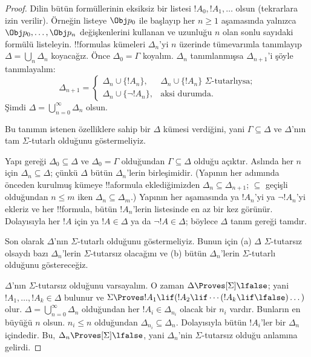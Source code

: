 \begin{proof}
Dilin bütün formüllerinin eksiksiz bir listesi $!A_0,!A_1,\dots$ olsun
(tekrarlara izin verilir). Örneğin listeye $\Obj p_0$ ile başlayıp her
$n\ge 1$ aşamasında yalnızca $\Obj p_0,\dots,\Obj p_n$ değişkenlerini
kullanan ve uzunluğu $n$ olan sonlu sayıdaki formülü listeleyin. !!{formula}s
kümeleri $\Delta_n$'yi $n$ üzerinde tümevarımla tanımlayıp
$\Delta=\bigcup_n\Delta_n$ koyacağız. Önce $\Delta_0=\Gamma$ koyalım.
$\Delta_n$ tanımlanmışsa $\Delta_{n+1}$'i şöyle tanımlayalım:
\[
\Delta_{n+1} =
\begin{cases}
  \Delta_n \cup \{!A_n\}, & \text{$\Delta_n \cup \{ !A_n\}$
    $\Sigma$-tutarlıysa;} \\
  \Delta_n \cup \{ \lnot !A_n\}, & \text{aksi durumda.}
\end{cases}
\]
Şimdi $\Delta=\bigcup_{n=0}^\infty\Delta_n$ olsun.

Bu tanımın istenen özelliklere sahip bir $\Delta$ kümesi verdiğini, yani
$\Gamma\subseteq\Delta$ ve $\Delta$'nın tam $\Sigma$-tutarlı olduğunu
göstermeliyiz.

Yapı gereği $\Delta_0\subseteq\Delta$ ve $\Delta_0=\Gamma$ olduğundan
$\Gamma\subseteq\Delta$ olduğu açıktır. Aslında her $n$ için
$\Delta_n\subseteq\Delta$; çünkü $\Delta$ bütün $\Delta_n$'lerin
birleşimidir. (Yapının her adımında önceden kurulmuş kümeye !!a{formula}
eklediğimizden $\Delta_n\subseteq\Delta_{n+1}$; $\subseteq$ geçişli
olduğundan $n\le m$ iken $\Delta_n\subseteq\Delta_m$.) Yapının her
aşamasında ya $!A_n$'yi ya $\lnot !A_n$'yi ekleriz ve her !!{formula}, bütün
$!A_n$'lerin listesinde en az bir kez görünür. Dolayısıyla her $!A$ için ya
$!A\in\Delta$ ya da $\lnot !A\in\Delta$; böylece $\Delta$ tanım gereği
tamdır.

Son olarak $\Delta$'nın $\Sigma$-tutarlı olduğunu göstermeliyiz. Bunun için
(a) $\Delta$ $\Sigma$-tutarsız olsaydı bazı $\Delta_n$'lerin
$\Sigma$-tutarsız olacağını ve (b) bütün $\Delta_n$'lerin
$\Sigma$-tutarlı olduğunu göstereceğiz.

$\Delta$'nın $\Sigma$-tutarsız olduğunu varsayalım. O zaman
$\Delta\Proves[\Sigma]\lfalse$; yani $!A_1,\dots,!A_k\in\Delta$ bulunur ve
$\Sigma\Proves !A_1\lif(!A_2\lif\cdots(!A_k\lif\lfalse)\dots)$ olur.
$\Delta=\bigcup_{n=0}^\infty\Delta_n$ olduğundan her
$!A_i\in\Delta_{n_i}$ olacak bir $n_i$ vardır. Bunların en büyüğü $n$ olsun.
$n_i\le n$ olduğundan $\Delta_{n_i}\subseteq\Delta_n$. Dolayısıyla bütün
$!A_i$'ler bir $\Delta_n$ içindedir. Bu, $\Delta_n\Proves[\Sigma]\lfalse$,
yani $\Delta_n$'nin $\Sigma$-tutarsız olduğu anlamına gelirdi.


\end{proof}
